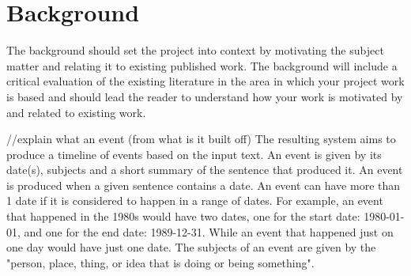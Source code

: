 \chapter{Background}
The background should set the project into context by motivating the subject matter and relating it to existing published work. The background will include a critical evaluation of the existing literature in the area in which your project work is based and should lead the reader to understand how your work is motivated by and related to existing work.

//explain what an event (from what is it built off)
The resulting system aims to produce a timeline of events based on the input text. An event is given by its date(s), subjects and a short summary of the sentence that produced it. An event is produced when a given sentence contains a date. An event can have more than 1 date if it is considered to happen in a range of dates. For example, an event that happened in the 1980s would have two dates, one for the start date: 1980-01-01, and one for the end date: 1989-12-31. While an event that happened just on one day would have just one date. The subjects of an event are given by the "person, place, thing, or idea that is doing or being something"\cite{grammar}.

